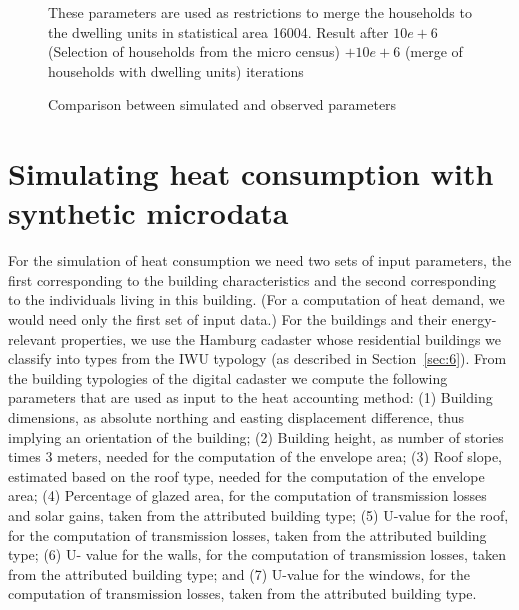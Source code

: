\documentclass[11pt]{IJM-article}
\begin{document}
\begin{figure}[htb]
    \centering 
    \caption{Comparison between simulated and observed parameters}\label{fig:6} 
    
    \begin{flushleft}
    \begin{footnotesize}
    These parameters are used as restrictions to merge the households to the
    dwelling units in statistical area 16004.  Result after $10e+6$ (Selection
    of households from the micro census) $+ 10e+6$ (merge of households with
    dwelling units) iterations
    \end{footnotesize}
    \end{flushleft}
\end{figure}

\section{Simulating heat consumption with synthetic microdata}\label{sec:8}

For the simulation of heat consumption we need two sets of input parameters,
the first corresponding to the building characteristics and the second
corresponding to the individuals living in this building. (For a computation of
heat demand, we would need only the first set of input data.) For the buildings
and their energy-relevant properties, we use the Hamburg cadaster whose
residential buildings we classify into types from the IWU typology (as
described in Section~\ref{sec:6}). From the building typologies of the digital
cadaster we compute the following parameters that are used as input to the heat
accounting method: (1) Building dimensions, as absolute northing and easting
displacement difference, thus implying an orientation of the building; (2)
Building height, as number of stories times 3 meters, needed for the
computation of the envelope area; (3) Roof slope, estimated based on the roof
type, needed for the computation of the envelope area; (4) Percentage of glazed
area, for the computation of transmission losses and solar gains, taken from
the attributed building type; (5) U-value for the roof, for the computation of
transmission losses, taken from the attributed building type; (6) U- value for
the walls, for the computation of transmission losses, taken from the
attributed building type; and (7) U-value for the windows, for the computation
of transmission losses, taken from the attributed building type.
\end{document}
